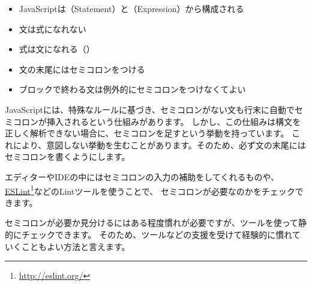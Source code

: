 \begin{itemize}
\item
  JavaScriptは（Statement）と（Expression）から構成される
\item
  文は式になれない
\item
  式は文になれる（）
\item
  文の末尾にはセミコロンをつける
\item
  ブロックで終わる文は例外的にセミコロンをつけなくてよい
\end{itemize}

JavaScriptには、特殊なルールに基づき、セミコロンがない文も行末に自動でセミコロンが挿入されるという仕組みがあります。
しかし、この仕組みは構文を正しく解析できない場合に、セミコロンを足すという挙動を持っています。
これにより、意図しない挙動を生むことがあります。そのため、必ず文の末尾にはセミコロンを書くようにします。

エディターやIDEの中にはセミコロンの入力の補助をしてくれるものや、\href{https://eslint.org/}{ESLint}\footnote{\url{http://eslint.org/}}などのLintツールを使うことで、
セミコロンが必要なのかをチェックできます。

セミコロンが必要か見分けるにはある程度慣れが必要ですが、ツールを使って静的にチェックできます。
そのため、ツールなどの支援を受けて経験的に慣れていくこともよい方法と言えます。

